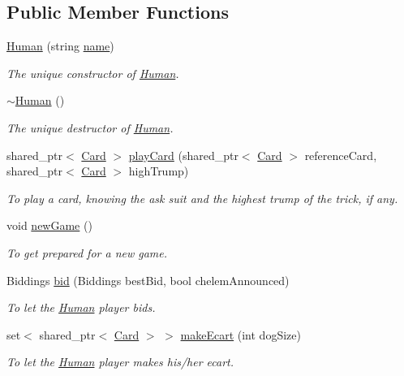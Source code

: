 \subsection*{\-Public \-Member \-Functions}
\begin{DoxyCompactItemize}
\item 
\hyperlink{classHuman_a8041607e0500c6858c9453b903d5b076}{\-Human} (string \hyperlink{classPlayer_acf0355128a99ee20ad9931b760fb2de1}{name})
\begin{DoxyCompactList}\small\item\em \-The unique constructor of \hyperlink{classHuman}{\-Human}. \end{DoxyCompactList}\item 
\hypertarget{classHuman_a93ca0fbf9e5b5bcb6f2f72eeb450219b}{\hyperlink{classHuman_a93ca0fbf9e5b5bcb6f2f72eeb450219b}{$\sim$\-Human} ()}\label{classHuman_a93ca0fbf9e5b5bcb6f2f72eeb450219b}

\begin{DoxyCompactList}\small\item\em \-The unique destructor of \hyperlink{classHuman}{\-Human}. \end{DoxyCompactList}\item 
shared\-\_\-ptr$<$ \hyperlink{classCard}{\-Card} $>$ \hyperlink{classHuman_a3258d3ce0eec7a5e393c639506ef28e5}{play\-Card} (shared\-\_\-ptr$<$ \hyperlink{classCard}{\-Card} $>$ reference\-Card, shared\-\_\-ptr$<$ \hyperlink{classCard}{\-Card} $>$ high\-Trump)
\begin{DoxyCompactList}\small\item\em \-To play a card, knowing the ask suit and the highest trump of the trick, if any. \end{DoxyCompactList}\item 
\hypertarget{classHuman_aae5efb6945fdbcda9c9a4d9e72d4a60e}{void \hyperlink{classHuman_aae5efb6945fdbcda9c9a4d9e72d4a60e}{new\-Game} ()}\label{classHuman_aae5efb6945fdbcda9c9a4d9e72d4a60e}

\begin{DoxyCompactList}\small\item\em \-To get prepared for a new game. \end{DoxyCompactList}\item 
\-Biddings \hyperlink{classHuman_aebbb26f8477fa2234bfa23d153a1bf0b}{bid} (\-Biddings best\-Bid, bool chelem\-Announced)
\begin{DoxyCompactList}\small\item\em \-To let the \hyperlink{classHuman}{\-Human} player bids. \end{DoxyCompactList}\item 
set$<$ shared\-\_\-ptr$<$ \hyperlink{classCard}{\-Card} $>$ $>$ \hyperlink{classHuman_accfa928e35d3ff981b7acb5e351eaeb5}{make\-Ecart} (int dog\-Size)
\begin{DoxyCompactList}\small\item\em \-To let the \hyperlink{classHuman}{\-Human} player makes his/her ecart. \end{DoxyCompactList}\end{DoxyCompactItemize}


